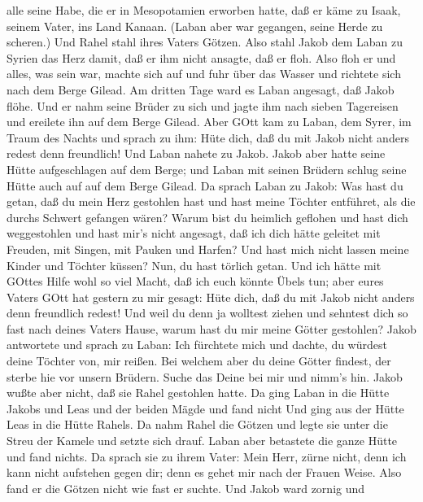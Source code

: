 alle seine Habe, die er in Mesopotamien erworben hatte, daß er käme zu
Isaak, seinem Vater, ins Land Kanaan.  (Laban aber war
gegangen, seine Herde zu scheren.) Und Rahel stahl ihres Vaters Götzen.
 Also stahl Jakob dem Laban zu Syrien das Herz damit, daß
er ihm nicht ansagte, daß er floh.  Also floh er und alles,
was sein war, machte sich auf und fuhr über das Wasser und richtete sich
nach dem Berge Gilead.  Am dritten Tage ward es Laban
angesagt, daß Jakob flöhe.  Und er nahm seine Brüder zu
sich und jagte ihm nach sieben Tagereisen und ereilete ihn auf dem Berge
Gilead.  Aber GOtt kam zu Laban, dem Syrer, im Traum des
Nachts und sprach zu ihm: Hüte dich, daß du mit Jakob nicht anders
redest denn freundlich!  Und Laban nahete zu Jakob. Jakob
aber hatte seine Hütte aufgeschlagen auf dem Berge; und Laban mit seinen
Brüdern schlug seine Hütte auch auf auf dem Berge Gilead. 
Da sprach Laban zu Jakob: Was hast du getan, daß du mein Herz gestohlen
hast und hast meine Töchter entführet, als die durchs Schwert gefangen
wären?  Warum bist du heimlich geflohen und hast dich
weggestohlen und hast mir's nicht angesagt, daß ich dich hätte geleitet
mit Freuden, mit Singen, mit Pauken und Harfen?  Und hast
mich nicht lassen meine Kinder und Töchter küssen? Nun, du hast törlich
getan.  Und ich hätte mit GOttes Hilfe wohl so viel Macht,
daß ich euch könnte Übels tun; aber eures Vaters GOtt hat gestern zu mir
gesagt: Hüte dich, daß du mit Jakob nicht anders denn freundlich redest!
 Und weil du denn ja wolltest ziehen und sehntest dich so
fast nach deines Vaters Hause, warum hast du mir meine Götter gestohlen?
 Jakob antwortete und sprach zu Laban: Ich fürchtete mich
und dachte, du würdest deine Töchter von, mir reißen.  Bei
welchem aber du deine Götter findest, der sterbe hie vor unsern Brüdern.
Suche das Deine bei mir und nimm's hin. Jakob wußte aber nicht, daß sie
Rahel gestohlen hatte.  Da ging Laban in die Hütte Jakobs
und Leas und der beiden Mägde und fand nicht Und ging aus der Hütte Leas
in die Hütte Rahels.  Da nahm Rahel die Götzen und legte
sie unter die Streu der Kamele und setzte sich drauf. Laban aber
betastete die ganze Hütte und fand nichts.  Da sprach sie
zu ihrem Vater: Mein Herr, zürne nicht, denn ich kann nicht aufstehen
gegen dir; denn es gehet mir nach der Frauen Weise. Also fand er die
Götzen nicht wie fast er suchte.  Und Jakob ward zornig und
